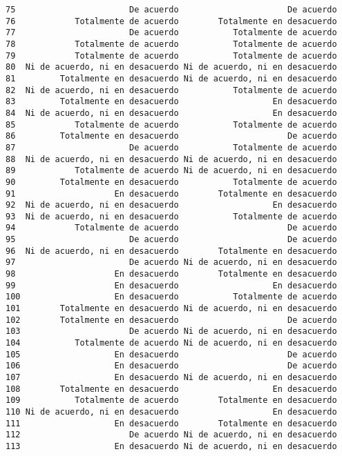 \documentclass[
  letterpaper,
  DIV=11,
  numbers=noendperiod]{scrartcl}
\begin{document}
\begin{verbatim}
75                       De acuerdo                      De acuerdo
76            Totalmente de acuerdo        Totalmente en desacuerdo
77                       De acuerdo           Totalmente de acuerdo
78            Totalmente de acuerdo           Totalmente de acuerdo
79            Totalmente de acuerdo           Totalmente de acuerdo
80  Ni de acuerdo, ni en desacuerdo Ni de acuerdo, ni en desacuerdo
81         Totalmente en desacuerdo Ni de acuerdo, ni en desacuerdo
82  Ni de acuerdo, ni en desacuerdo           Totalmente de acuerdo
83         Totalmente en desacuerdo                   En desacuerdo
84  Ni de acuerdo, ni en desacuerdo                   En desacuerdo
85            Totalmente de acuerdo           Totalmente de acuerdo
86         Totalmente en desacuerdo                      De acuerdo
87                       De acuerdo           Totalmente de acuerdo
88  Ni de acuerdo, ni en desacuerdo Ni de acuerdo, ni en desacuerdo
89            Totalmente de acuerdo Ni de acuerdo, ni en desacuerdo
90         Totalmente en desacuerdo           Totalmente de acuerdo
91                    En desacuerdo        Totalmente en desacuerdo
92  Ni de acuerdo, ni en desacuerdo                   En desacuerdo
93  Ni de acuerdo, ni en desacuerdo           Totalmente de acuerdo
94            Totalmente de acuerdo                      De acuerdo
95                       De acuerdo                      De acuerdo
96  Ni de acuerdo, ni en desacuerdo        Totalmente en desacuerdo
97                       De acuerdo Ni de acuerdo, ni en desacuerdo
98                    En desacuerdo        Totalmente en desacuerdo
99                    En desacuerdo                   En desacuerdo
100                   En desacuerdo           Totalmente de acuerdo
101        Totalmente en desacuerdo Ni de acuerdo, ni en desacuerdo
102        Totalmente en desacuerdo                      De acuerdo
103                      De acuerdo Ni de acuerdo, ni en desacuerdo
104           Totalmente de acuerdo Ni de acuerdo, ni en desacuerdo
105                   En desacuerdo                      De acuerdo
106                   En desacuerdo                      De acuerdo
107                   En desacuerdo Ni de acuerdo, ni en desacuerdo
108        Totalmente en desacuerdo                   En desacuerdo
109           Totalmente de acuerdo        Totalmente en desacuerdo
110 Ni de acuerdo, ni en desacuerdo                   En desacuerdo
111                   En desacuerdo        Totalmente en desacuerdo
112                      De acuerdo Ni de acuerdo, ni en desacuerdo
113                   En desacuerdo Ni de acuerdo, ni en desacuerdo

\end{verbatim}
\end{document}
